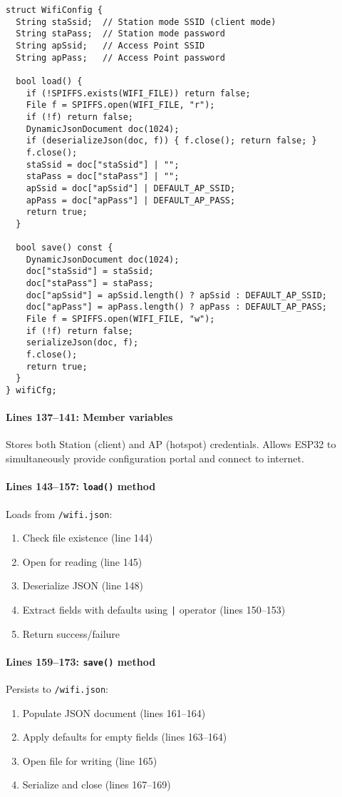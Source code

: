 \documentclass[11pt,a4paper]{article}
\begin{document}
\begin{verbatim}
struct WifiConfig {
  String staSsid;  // Station mode SSID (client mode)
  String staPass;  // Station mode password
  String apSsid;   // Access Point SSID
  String apPass;   // Access Point password

  bool load() {
    if (!SPIFFS.exists(WIFI_FILE)) return false;
    File f = SPIFFS.open(WIFI_FILE, "r");
    if (!f) return false;
    DynamicJsonDocument doc(1024);
    if (deserializeJson(doc, f)) { f.close(); return false; }
    f.close();
    staSsid = doc["staSsid"] | "";
    staPass = doc["staPass"] | "";
    apSsid = doc["apSsid"] | DEFAULT_AP_SSID;
    apPass = doc["apPass"] | DEFAULT_AP_PASS;
    return true;
  }

  bool save() const {
    DynamicJsonDocument doc(1024);
    doc["staSsid"] = staSsid;
    doc["staPass"] = staPass;
    doc["apSsid"] = apSsid.length() ? apSsid : DEFAULT_AP_SSID;
    doc["apPass"] = apPass.length() ? apPass : DEFAULT_AP_PASS;
    File f = SPIFFS.open(WIFI_FILE, "w");
    if (!f) return false;
    serializeJson(doc, f);
    f.close();
    return true;
  }
} wifiCfg;
\end{verbatim}

\paragraph{Lines 137--141: Member variables}
Stores both Station (client) and AP (hotspot) credentials. Allows ESP32 to simultaneously provide configuration portal and connect to internet.

\paragraph{Lines 143--157: \texttt{load()} method}
Loads from \texttt{/wifi.json}:
\begin{enumerate}[leftmargin=*]
  \item Check file existence (line 144)
  \item Open for reading (line 145)
  \item Deserialize JSON (line 148)
  \item Extract fields with defaults using \texttt{|} operator (lines 150--153)
  \item Return success/failure
\end{enumerate}

\paragraph{Lines 159--173: \texttt{save()} method}
Persists to \texttt{/wifi.json}:
\begin{enumerate}[leftmargin=*]
  \item Populate JSON document (lines 161--164)
  \item Apply defaults for empty fields (lines 163--164)
  \item Open file for writing (line 165)
  \item Serialize and close (lines 167--169)
\end{enumerate}
\end{document}
